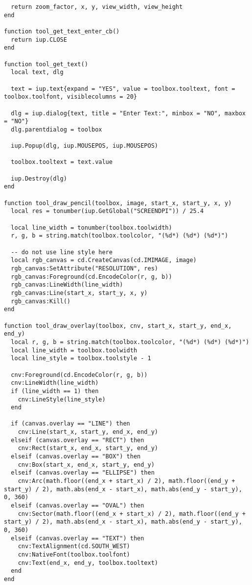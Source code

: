 \documentclass{ctexart}
\begin{document}
\begin{lstlisting}
  return zoom_factor, x, y, view_width, view_height
end

function tool_get_text_enter_cb()
  return iup.CLOSE
end

function tool_get_text()
  local text, dlg
  
  text = iup.text{expand = "YES", value = toolbox.tooltext, font = toolbox.toolfont, visiblecolumns = 20}

  dlg = iup.dialog{text, title = "Enter Text:", minbox = "NO", maxbox = "NO"}
  dlg.parentdialog = toolbox

  iup.Popup(dlg, iup.MOUSEPOS, iup.MOUSEPOS)

  toolbox.tooltext = text.value

  iup.Destroy(dlg)
end

function tool_draw_pencil(toolbox, image, start_x, start_y, x, y)
  local res = tonumber(iup.GetGlobal("SCREENDPI")) / 25.4

  local line_width = tonumber(toolbox.toolwidth)
  r, g, b = string.match(toolbox.toolcolor, "(%d*) (%d*) (%d*)")
  
  -- do not use line style here
  local rgb_canvas = cd.CreateCanvas(cd.IMIMAGE, image)
  rgb_canvas:SetAttribute("RESOLUTION", res)
  rgb_canvas:Foreground(cd.EncodeColor(r, g, b))
  rgb_canvas:LineWidth(line_width)
  rgb_canvas:Line(start_x, start_y, x, y)
  rgb_canvas:Kill()
end

function tool_draw_overlay(toolbox, cnv, start_x, start_y, end_x, end_y)
  local r, g, b = string.match(toolbox.toolcolor, "(%d*) (%d*) (%d*)")
  local line_width = toolbox.toolwidth
  local line_style = toolbox.toolstyle - 1
  
  cnv:Foreground(cd.EncodeColor(r, g, b))
  cnv:LineWidth(line_width)
  if (line_width == 1) then
    cnv:LineStyle(line_style)
  end
  
  if (canvas.overlay == "LINE") then
    cnv:Line(start_x, start_y, end_x, end_y)
  elseif (canvas.overlay == "RECT") then
    cnv:Rect(start_x, end_x, start_y, end_y)
  elseif (canvas.overlay == "BOX") then
    cnv:Box(start_x, end_x, start_y, end_y)
  elseif (canvas.overlay == "ELLIPSE") then
    cnv:Arc(math.floor((end_x + start_x) / 2), math.floor((end_y + start_y) / 2), math.abs(end_x - start_x), math.abs(end_y - start_y), 0, 360)
  elseif (canvas.overlay == "OVAL") then
    cnv:Sector(math.floor((end_x + start_x) / 2), math.floor((end_y + start_y) / 2), math.abs(end_x - start_x), math.abs(end_y - start_y), 0, 360)
  elseif (canvas.overlay == "TEXT") then
    cnv:TextAlignment(cd.SOUTH_WEST)
    cnv:NativeFont(toolbox.toolfont)
    cnv:Text(end_x, end_y, toolbox.tooltext)
  end
end



\end{lstlisting}
\end{document}
